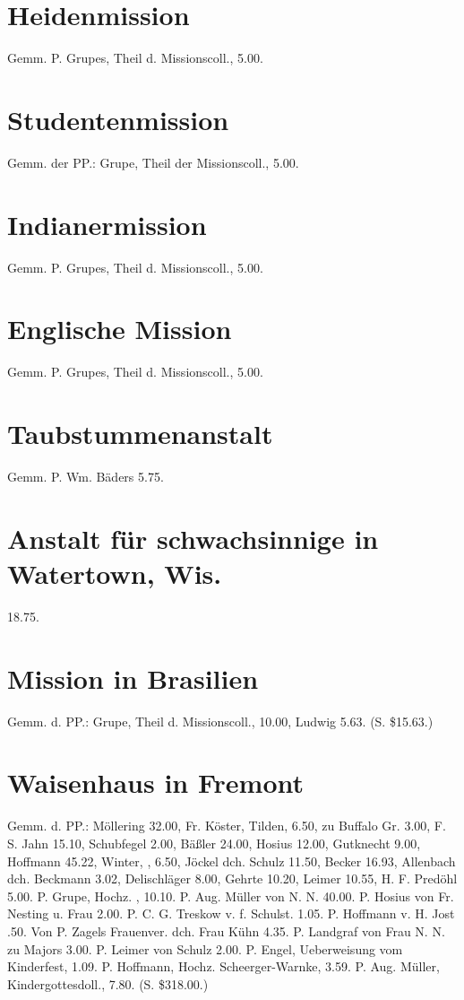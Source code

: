 \section{Heidenmission}

Gemm. P. Grupes, Theil d. Missionscoll., 5.00.

\section{Studentenmission}

Gemm. der PP.: Grupe, Theil der Missionscoll., 5.00.

\section{Indianermission}

Gemm. P. Grupes, Theil d. Missionscoll., 5.00.

\section{Englische Mission}

Gemm. P. Grupes, Theil d. Missionscoll., 5.00.

\section{Taubstummenanstalt}

Gemm. P. Wm. Bäders 5.75.

\section{Anstalt für schwachsinnige in Watertown, Wis.}

 18.75.

\section{Mission in Brasilien}

Gemm. d. PP.: Grupe, Theil d. Missionscoll., 10.00, Ludwig 5.63. (S. \$15.63.)

\section{Waisenhaus in Fremont}

Gemm. d. PP.: Möllering 32.00, Fr. Köster, Tilden, 6.50, zu Buffalo Gr. 3.00, F. S. Jahn 15.10, Schubfegel 2.00, Bäßler 24.00, Hosius 12.00, Gutknecht 9.00, Hoffmann 45.22, Winter, , 6.50, Jöckel dch. Schulz 11.50, Becker 16.93, Allenbach dch. Beckmann 3.02, Delischläger 8.00, Gehrte 10.20, Leimer 10.55, H. F. Predöhl 5.00. P. Grupe, Hochz. , 10.10. P. Aug. Müller von N. N. 40.00. P. Hosius von Fr. Nesting u. Frau 2.00. P. C. G. Treskow v. f. Schulst. 1.05. P. Hoffmann v. H. Jost .50. Von P. Zagels Frauenver. dch. Frau Kühn 4.35. P. Landgraf von Frau N. N. zu Majors 3.00. P. Leimer von Schulz 2.00. P. Engel, Ueberweisung vom Kinderfest, 1.09. P. Hoffmann, Hochz. Scheerger-Warnke, 3.59. P. Aug. Müller, Kindergottesdoll., 7.80. (S. \$318.00.)

